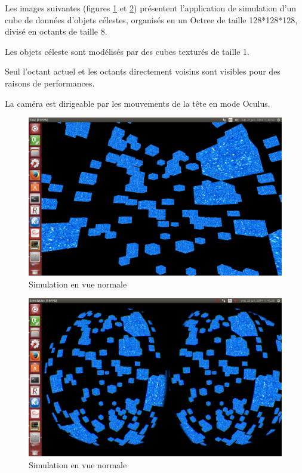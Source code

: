 \documentclass[a4paper,french,12pt]{article}
\begin{document}
		\FloatBarrier
		Les images suivantes (figures \ref{octree_normal} et \ref{octree_oculus}) présentent l'application de simulation d'un cube de données d'objets célestes, 
		organisés en un Octree  de taille 128*128*128, divisé en octants de taille 8.
		
		Les objets céleste sont modélisés par des cubes texturés de taille 1.
		
		Seul l'octant actuel et les octants directement voisins sont visibles pour des raisons de performances.
		
		La caméra est dirigeable par les mouvements de la tête en mode Oculus.
		
		
		\begin{figure}
			      \centering
			      \includegraphics[width=1.0\textwidth]{octree_normal.png}
			      \caption{Simulation en vue normale}
			      \label{octree_normal}
		\end{figure}
		
		\begin{figure}
			      \centering
			      \includegraphics[width=1.0\textwidth]{octree_oculus.png}
			      \caption{Simulation en vue normale}
			      \label{octree_oculus}
		\end{figure}
		\FloatBarrier
		
\end{document}

